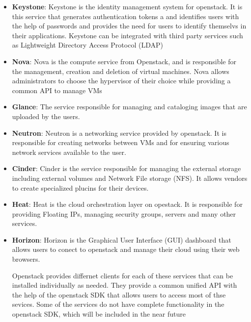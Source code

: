 \begin{itemize}
\item \textbf{Keystone}: Keystone is the identity management system for
openstack. It is this service that generates authentication tokens a and
identifies users with the help of passwords and provides the need for
users to identify themselvs in their applications. Keystone can be
integrated with third party services such as Lightweight Directory
Access Protocol (LDAP)

\item \textbf{Nova}: Nova is the compute service from Openstack, and is
responsible for the management, creation and deletion of virtual machines.
Nova allows administrators to choose the hypervisor of their choice while
providing a common API to manage VMs

\item \textbf{Glance}: The service responsible for managing and cataloging
images that are uploaded by the users.

\item \textbf{Neutron}: Neutron is a networking service provided by openstack.
It is responsible for creating networks between VMs and for ensuring various
network services available to the user.

\item \textbf{Cinder}: Cinder is the service responsible for managing the
external storage including external volumes and Network File storage (NFS).
It allows vendors to create specialized plucins for their devices.

\item \textbf{Heat}: Heat is the cloud orchestration layer on opestack. It
is responsible for providing Floating IPs, managing security groups, servers
and many other services.

\item \textbf{Horizon}: Horizon is the Graphical User Interface (GUI) dashboard
that allows users to conect to openstack and manage their cloud using their
web browsers. 

Openstack provides differnet clients for each of these services that
can be installed individually as needed. They provide a common unified
API with the help of the openstack SDK that allows users to access
most of thse sevices. Some of the services do not have complete
functionality in the openstack SDK, which will be included in the near
future

\end{itemize}
